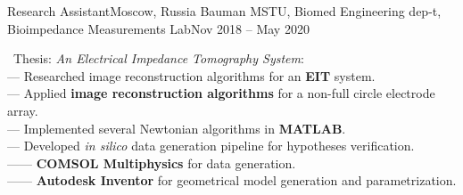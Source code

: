 \resumeSubheading
{Research Assistant}{Moscow, Russia}
{Bauman MSTU, Biomed Engineering dep-t, Bioimpedance Measurements Lab}{Nov 2018 -- May 2020}
\begin{itemize}[leftmargin=0in, label={}]
    \small{\item{
        {\textbullet \ Thesis: \textit{An Electrical Impedance Tomography System}:}\\
        {— Researched image reconstruction algorithms for an \textbf{EIT} system.}\\
        {— Applied \textbf{image reconstruction algorithms} for a non-full circle electrode array.}\\
        {— Implemented several Newtonian algorithms in \textbf{MATLAB}.}\\
        {— Developed \textit{in silico} data generation pipeline for hypotheses verification.}\\
        {—— \textbf{COMSOL Multiphysics} for data generation.}\\
        {—— \textbf{Autodesk Inventor} for geometrical model generation and parametrization.}
    }}
\end{itemize}